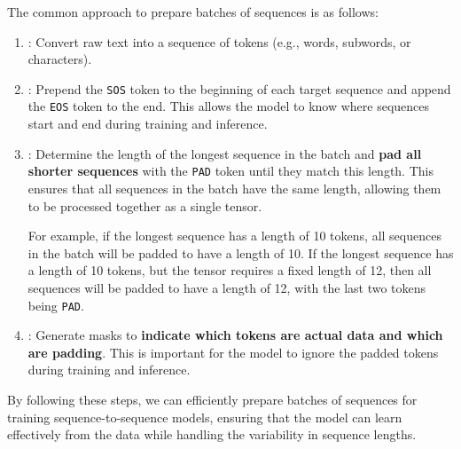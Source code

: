 \highspace
The common approach to prepare batches of sequences is as follows:
\begin{enumerate}
    \item {}: Convert raw text into a sequence of tokens (e.g., words, subwords, or characters).
    
    
    \item {}: Prepend the \texttt{SOS} token to the beginning of each target sequence and append the \texttt{EOS} token to the end. This allows the model to know where sequences start and end during training and inference.
    
    
    \item {}: Determine the length of the longest sequence in the batch and \textbf{pad all shorter sequences} with the \texttt{PAD} token until they match this length. This ensures that all sequences in the batch have the same length, allowing them to be processed together as a single tensor.
    
    For example, if the longest sequence has a length of 10 tokens, all sequences in the batch will be padded to have a length of 10. If the longest sequence has a length of 10 tokens, but the tensor requires a fixed length of 12, then all sequences will be padded to have a length of 12, with the last two tokens being \texttt{PAD}.


    \item {}: Generate masks to \textbf{indicate which tokens are actual data and which are padding}. This is important for the model to ignore the padded tokens during training and inference.
\end{enumerate}
By following these steps, we can efficiently prepare batches of sequences for training sequence-to-sequence models, ensuring that the model can learn effectively from the data while handling the variability in sequence lengths.